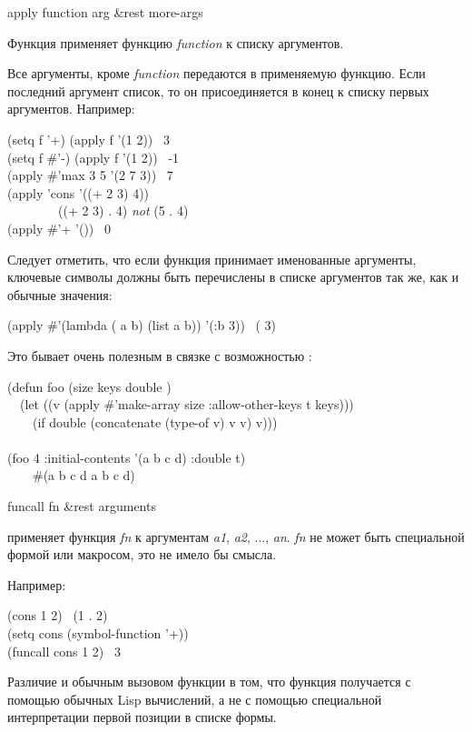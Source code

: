 \begin{defun}[Function]
apply function arg &rest more-args

Функция применяет функцию \emph{function} к списку аргументов.

Все аргументы, кроме \emph{function} передаются в применяемую функцию.
Если последний аргумент список, то он присоединяется в конец к списку первых
аргументов. Например:
\begin{lisp}
(setq f '+) (apply f '(1 2)) \EV\ 3 \\
(setq f \#'-) (apply f '(1 2)) \EV\ -1 \\
(apply \#'max 3 5 '(2 7 3)) \EV\ 7 \\
(apply 'cons '((+ 2 3) 4)) {\EV} \\
~~~~~~~~((+ 2 3) . 4)	\emph{not} (5 . 4) \\
(apply \#'+ '()) \EV\ 0
\end{lisp}
Следует отметить, что если функция принимает именованные аргументы, ключевые
символы должны быть перечислены в списке аргументов так же, как и обычные
значения:
\begin{lisp}
(apply \#'(lambda ( a b) (list a b)) '(:b 3)) \EV\ ({\nil} 3)
\end{lisp}
Это бывает очень полезным в связке с возможностью :
\begin{lisp}
(defun foo (size  keys  double ) \\
~~(let ((v (apply \#'make-array size :allow-other-keys t keys))) \\
~~~~(if double (concatenate (type-of v) v v) v))) \\
 \\
(foo 4 :initial-contents '(a b c d) :double t) \\
~~~\EV\ \#(a b c d a b c d)
\end{lisp}
\end{defun}

\begin{defun}[Function]
funcall fn &rest arguments

применяет функция \emph{fn} к аргументам 
\emph{a1}, \emph{a2}, ..., \emph{an}.
\emph{fn} не может быть специальной формой или макросом, это не имело бы
смысла. 

Например:
\begin{lisp}
(cons 1 2) \EV\ (1 . 2) \\
(setq cons (symbol-function '+)) \\
(funcall cons 1 2) \EV\ 3
\end{lisp}
Различие  и обычным вызовом функции в том, что функция
получается с помощью обычных Lisp вычислений, а не с помощью специальной
интерпретации первой позиции в списке формы.
\end{defun}

